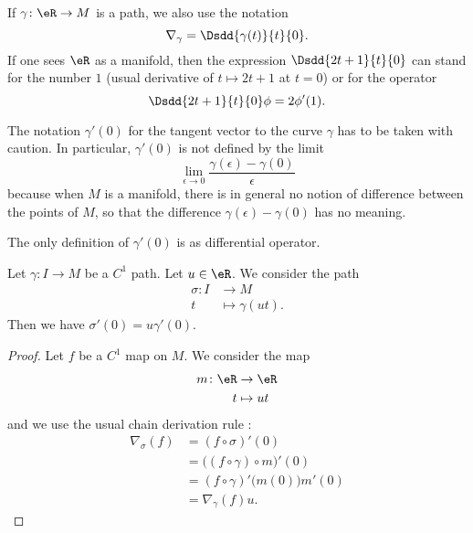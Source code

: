 If \( \gamma\colon \eR\to M\) is a path, we also use the notation
\begin{equation}        \label{EQooJQVRooLziKoH}
	\nabla_{\gamma}=\Dsdd{ \gamma(t) }{t}{0}.
\end{equation}
If one sees \( \eR\) as a manifold, then the expression \( \Dsdd{ 2t+1 }{t}{0}\) can stand for the number \( 1\) (usual derivative of \( t\mapsto 2t+1\) at \( t=0\)) or for the operator
\begin{equation}
	\Dsdd{ 2t+1 }{t}{0}\phi=2\phi'(1).
\end{equation}

\begin{remark}      \label{REMooJQFHooQuoZxt}
	The notation \( \gamma'(0)\) for the tangent vector to the curve \( \gamma\) has to be taken with caution. In particular, \( \gamma'(0)\) is not defined by the limit
	\begin{equation}        \label{EQooVMGFooFUCNEY}
		\lim_{\epsilon\to 0} \frac{ \gamma(\epsilon)-\gamma(0) }{ \epsilon }
	\end{equation}
	because when \( M\) is a manifold, there is in general no notion of difference between the points of \( M\), so that the difference \( \gamma(\epsilon)-\gamma(0)\) has no meaning.

	The only definition of \( \gamma'(0)\) is as differential operator.
\end{remark}


\begin{lemma}        \label{LEMooMHSQooQyTZCg}
	Let \( \gamma\colon I\to M\) be a \( C^1\) path. Let \( u\in \eR\). We consider the path
	\begin{equation}
		\begin{aligned}
			\sigma\colon I & \to M               \\
			t              & \mapsto \gamma(ut).
		\end{aligned}
	\end{equation}
	Then we have \( \sigma'(0)=u\gamma'(0)\).
\end{lemma}

\begin{proof}
	Let \( f\) be a \( C^1\) map on \( M\). We consider the map
	\begin{equation}
		\begin{aligned}
			m\colon \eR & \to \eR    \\
			t           & \mapsto ut
		\end{aligned}
	\end{equation}
	and we use the usual chain derivation rule :
	\begin{subequations}
		\begin{align}
			\nabla_{\sigma}(f) & =(f\circ\sigma)'(0)                    \\
			                   & =\Big( (f\circ\gamma)\circ m \Big)'(0) \\
			                   & =(f\circ\gamma)'\big( m(0) \big)m'(0)  \\
			                   & =\nabla_{\gamma}(f)u.
		\end{align}
	\end{subequations}
\end{proof}


